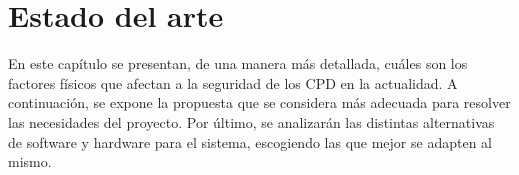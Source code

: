 \chapter{Estado del arte}
\label{ch:estado}
En este capítulo se presentan, de una manera más detallada, cuáles son los factores físicos que afectan a la seguridad de los CPD en la actualidad. %
A continuación, se expone la propuesta que se considera más adecuada para resolver las necesidades del proyecto. Por último, se analizarán las distintas alternativas de software y hardware para el sistema, escogiendo las que mejor se adapten al mismo.

